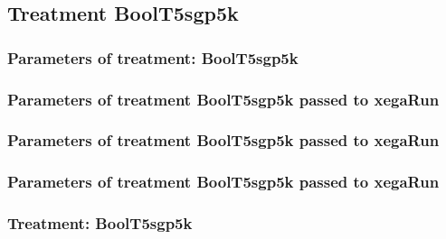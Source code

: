 \documentclass[18pt,c]{beamer}
\begin{document}
\clearpage
\subsection{Treatment BoolT5sgp5k}

 \begin{frame}
 \fontsize{8pt}{9pt}\selectfont
 \frametitle{  Parameters of treatment: BoolT5sgp5k 
 }

 \label{ExpFtParmTable024.tex}  
 \end{frame}


 \begin{frame}
 \fontsize{8pt}{9pt}\selectfont
 \frametitle{  Parameters of treatment BoolT5sgp5k passed to xegaRun
 }

 \label{ExpFtParmTable025.tex}  
 \end{frame}


 \begin{frame}
 \fontsize{8pt}{9pt}\selectfont
 \frametitle{  Parameters of treatment BoolT5sgp5k passed to xegaRun
 }

 \label{ExpFtParmTable026.tex}  
 \end{frame}


 \begin{frame}
 \fontsize{8pt}{9pt}\selectfont
 \frametitle{  Parameters of treatment BoolT5sgp5k passed to xegaRun
 }

 \label{ExpFtParmTable027.tex}  
 \end{frame}

 \begin{frame}
 \fontsize{8pt}{9pt}\selectfont
 \frametitle{ Treatment: BoolT5sgp5k }

 \label{ExpFStatsTable009.tex}  
 \end{frame}
\end{document}
